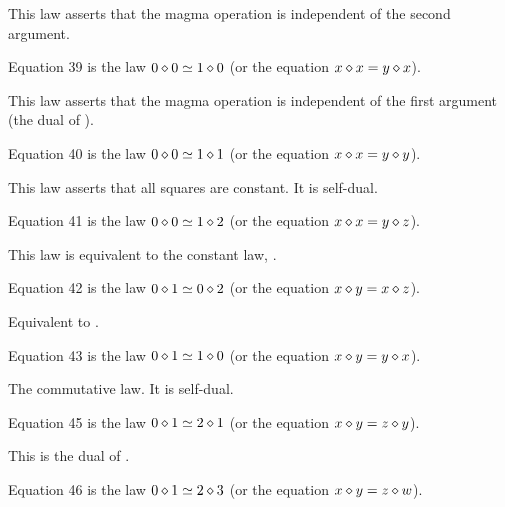 This law asserts that the magma operation is independent of the second argument.

\begin{definition}[Equation 39]\label{eq39}\leanok{}  Equation 39 is the law $0 \diamond 0  \simeq  1 \diamond 0$ (or the equation $x \diamond x = y \diamond x$).
\end{definition}

This law asserts that the magma operation is independent of the first argument (the dual of ).

\begin{definition}[Equation 40]\label{eq40}\leanok{}  Equation 40 is the law $0 \diamond 0  \simeq  1 \diamond 1$ (or the equation $x \diamond x = y \diamond y$).
\end{definition}

This law asserts that all squares are constant. It is self-dual.

\begin{definition}[Equation 41]\label{eq41}\leanok{}  Equation 41 is the law $0 \diamond 0  \simeq  1 \diamond 2$ (or the equation $x \diamond x = y \diamond z$).
\end{definition}

This law is equivalent to the constant law, .

\begin{definition}[Equation 42]\label{eq42}\leanok{}  Equation 42 is the law $0 \diamond 1  \simeq  0 \diamond 2$ (or the equation $x \diamond y = x \diamond z$).
\end{definition}

Equivalent to .

\begin{definition}[Equation 43]\label{eq43}\leanok{}  Equation 43 is the law $0 \diamond 1  \simeq  1 \diamond 0$ (or the equation $x \diamond y = y \diamond x$).
\end{definition}

The commutative law. It is self-dual.

\begin{definition}[Equation 45]\label{eq45}\leanok{}  Equation 45 is the law $0 \diamond 1  \simeq  2 \diamond 1$ (or the equation $x \diamond y = z \diamond y$).
\end{definition}

This is the dual of .

\begin{definition}[Equation 46]\label{eq46}\leanok{}  Equation 46 is the law $0 \diamond 1  \simeq  2 \diamond 3$ (or the equation $x \diamond y = z \diamond w$).
\end{definition}

